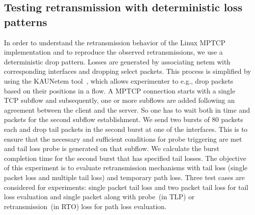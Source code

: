 \documentclass[10pt,conference,compsoc]{IEEEtran}
\begin{document}
 
\begin{center}

\begin{table}
\end{table}
\end{center}


\subsection{Testing retransmission with deterministic loss patterns}
In order to understand the retransmission behavior of the Linux MPTCP implementation and to reproduce the observed retransmissions, we use a deterministic drop pattern. Losses are generated by associating netem with corresponding interfaces and dropping select packets. This process is simplified by using the KAUNetem tool~\cite{Garcia2016}, which allows experimenter to e.g., drop packets based on their positions in a flow. A MPTCP connection starts with a single TCP subflow and subsequently, one or more subflows are added following an agreement between the client and the server. So one has to wait both in time and packets for the second subflow establishment. We send two bursts of 80 packets each and drop tail packets in the second burst at one of the interfaces. This is to ensure that the necessary and sufficient conditions for probe triggering are met and tail loss probe is generated on that subflow. We calculate the burst completion time for the second burst that has specified tail losses. The objective of this experiment is to evaluate retransmission mechanisms with tail loss (single packet loss and multiple tail loss) and temporary path loss. Three test cases are considered for experiments: single packet tail loss and two packet tail loss for tail loss evaluation and single packet along with probe~(in TLP) or retransmission~(in RTO) loss for path loss evaluation. 
\end{document}
